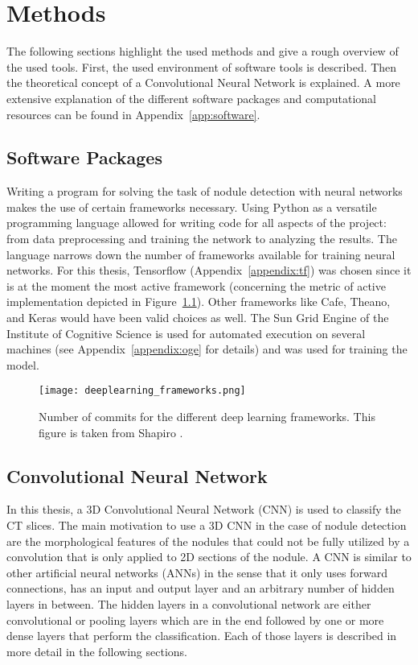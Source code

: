\documentclass[main.tex]{subfiles}
\begin{document}
\chapter{Methods}\label{chap:methods}
The following sections highlight the used methods and give a rough overview of the used tools. First, the used environment of software tools is described. Then the theoretical concept of a Convolutional Neural Network is explained. A more extensive explanation of the different software packages and computational resources can be found in Appendix~\ref{app:software}.

\section{Software Packages}
Writing a program for solving the task of nodule detection with neural networks makes the use of certain frameworks necessary. Using Python as a versatile programming language allowed for writing code for all aspects of the project: from data preprocessing and training the network to analyzing the results. The language narrows down the number of frameworks available for training neural networks. For this thesis, Tensorflow (Appendix~\ref{appendix:tf}) was chosen since it is at the moment the most active framework (concerning the metric of active implementation depicted in Figure~\ref{fig:frameworks}). Other frameworks like Cafe, Theano, and Keras would have been valid choices as well. The Sun Grid Engine of the Institute of Cognitive Science is used for automated execution on several machines (see Appendix~\ref{appendix:oge} for details) and was used for training the model.

\begin{figure}
\begin{center}
\texttt{[image: deeplearning\_frameworks.png]}
\end{center}
\caption{Number of commits for the different deep learning frameworks. This figure is taken from Shapiro \cite{shapiro2017}.}
\label{fig:frameworks}
\end{figure}


\section{Convolutional Neural Network}
In this thesis, a 3D Convolutional Neural Network (CNN) is used to classify the CT slices. The main motivation to use a 3D CNN in the case of nodule detection are the morphological features of the nodules that could not be fully utilized by a convolution that is only applied to 2D sections of the nodule. A CNN is similar to other artificial neural networks (ANNs) in the sense that it only uses forward connections, has an input and output layer and an arbitrary number of hidden layers in between. The hidden layers in a convolutional network are either convolutional or pooling layers which are in the end followed by one or more dense layers that perform the classification. Each of those layers is described in more detail in the following sections.
\end{document}
